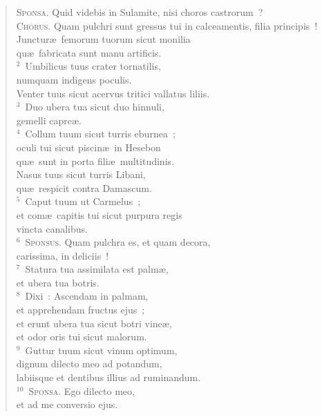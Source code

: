\begin{flushleft}\begin{verse}\vspace{-19pt}\textsc{Sponsa.} Quid videbis in Sulamite, nisi choros castrorum~?\\ \textsc{Chorus.} Quam pulchri sunt gressus tui in calceamentis, filia principis~!\\ Junctur\ae\ femorum tuorum sicut monilia\\ qu\ae\ fabricata sunt manu artificis.\\
${}^{2}$~Umbilicus tuus crater tornatilis,\\ numquam indigens poculis.\\ Venter tuus sicut acervus tritici vallatus liliis.\\
${}^{3}$~Duo ubera tua sicut duo hinnuli,\\ gemelli capre\ae .\\
${}^{4}$~Collum tuum sicut turris eburnea~;\\ oculi tui sicut piscin\ae\ in Hesebon\\ qu\ae\ sunt in porta fili\ae\ multitudinis.\\ Nasus tuus sicut turris Libani,\\ qu\ae\ respicit contra Damascum.\\
${}^{5}$~Caput tuum ut Carmelus~;\\ et com\ae\ capitis tui sicut purpura regis\\ vincta canalibus.\\
${}^{6}$~\textsc{Sponsus.} Quam pulchra es, et quam decora,\\ carissima, in deliciis~!\\
${}^{7}$~Statura tua assimilata est palm\ae ,\\ et ubera tua botris.\\
${}^{8}$~Dixi~: Ascendam in palmam,\\ et apprehendam fructus ejus~;\\ et erunt ubera tua sicut botri vine\ae ,\\ et odor oris tui sicut malorum.\\
${}^{9}$~Guttur tuum sicut vinum optimum,\\ dignum dilecto meo ad potandum,\\ labiisque et dentibus illius ad ruminandum.\\
${}^{10}$~\textsc{Sponsa.} Ego dilecto meo,\\ et ad me conversio ejus.\\

\end{verse}
\end{flushleft}

